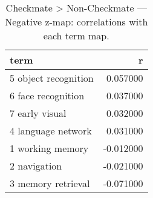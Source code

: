 \begin{table}
\caption{Checkmate > Non-Checkmate — Negative z-map: correlations with each term map.}
\label{tab:Checkmate > Non-Checkmate_neg}
\begin{tabular}{lr}
\toprule
term & r \\
\midrule
5 object recognition & 0.057000 \\
6 face recognition & 0.037000 \\
7 early visual & 0.032000 \\
4 language network & 0.031000 \\
1 working memory & -0.012000 \\
2 navigation & -0.021000 \\
3 memory retrieval & -0.071000 \\
\bottomrule
\end{tabular}
\end{table}
